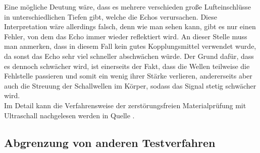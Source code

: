 \documentclass[reducespace,stylepage,semiarbeit]{spezidoc}
\begin{document}
Eine mögliche Deutung wäre, dass es mehrere verschieden große Lufteinschlüsse in unterschiedlichen Tiefen gibt, welche die Echos verursachen. 
Diese Interpretation wäre allerdings falsch, denn wie man sehen kann, gibt es nur einen Fehler, von dem das Echo immer wieder reflektiert wird. 
An dieser Stelle muss man anmerken, dass in diesem Fall kein gutes Kopplungsmittel verwendet wurde, da sonst das Echo sehr viel schneller abschwächen würde. 
Der Grund dafür, dass es dennoch schwächer wird, ist einerseits der Fakt, dass die Wellen teilweise die Fehlstelle passieren und somit ein wenig ihrer Stärke verlieren, andererseits aber auch die Streuung der Schallwellen im Körper, sodass das Signal stetig schwächer wird.\\
Im Detail kann die Verfahrensweise der zerstörungsfreien Materialprüfung mit Ultraschall nachgelesen werden in Quelle 
\cite{karldeutsch}. %

\subsection{Abgrenzung von anderen Testverfahren}
\end{document}
